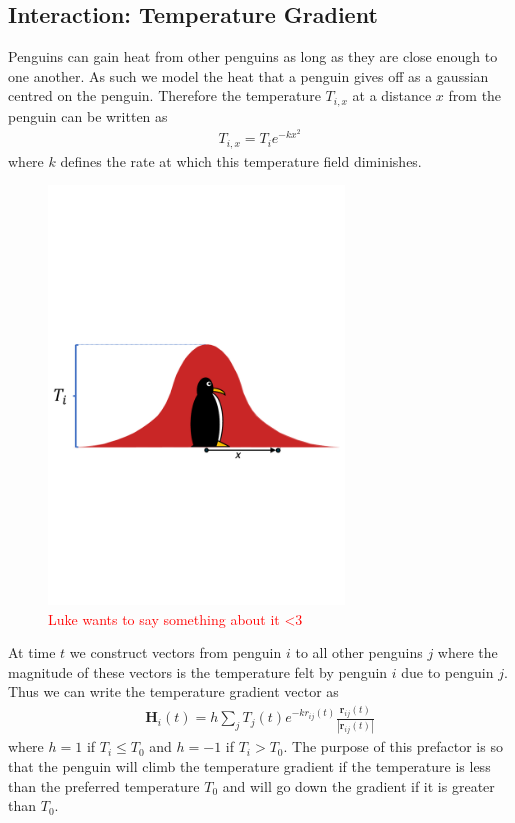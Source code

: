 \documentclass[]{scrartcl}
\newcommand{\todo}[1]{\textcolor{red}{ #1}}
\newcommand{\tb}{\textbf}
\begin{document}
\subsection{Interaction: Temperature Gradient}
Penguins can gain heat from other penguins as long as they are close enough to one another. As such we model the heat that a penguin gives off as a gaussian centred on the penguin. Therefore the temperature $T_{i,x}$ at a distance $x$ from the penguin can be written as 
\begin{align}
T_{i,x} = T_i e^{-k x^2}
\end{align}
where $k$ defines the rate at which this temperature field diminishes. 
\begin{figure}[H]
\centering
\includegraphics[width = 0.7\textwidth]{figs/fig3.pdf}
\caption{\todo{Luke wants to say something about it <3}}
\end{figure}

At time $t$ we construct vectors from penguin $i$ to all other penguins $j$ where the magnitude of these vectors is the temperature felt by penguin $i$ due to penguin $j$. Thus we can write the temperature gradient vector as 
\begin{align}
\tb{H}_i (t)= h \sum_j T_j (t) e^{-k r_{ij}(t)} \frac{\tb{r}_{ij}(t)}{|\tb{r}_{ij}(t)|}
\end{align}
where $h = 1$ if $T_i \leqslant T_0$ and $h = -1 $ if $T_i > T_0$. The purpose of this prefactor is so that the penguin will climb the temperature gradient if the temperature is less than the preferred temperature $T_0$ and will go down the gradient if it is greater than $T_0$. 
\end{document}
